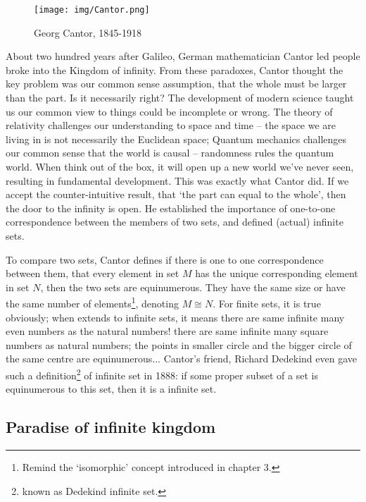 \documentclass{article}
\begin{document}
\begin{wrapfigure}{R}{0.4\textwidth}
 \centering
 \texttt{[image: img/Cantor.png]}
 \captionsetup{labelformat=empty}
 \caption{Georg Cantor, 1845-1918}
 \label{fig:Cantor}
\end{wrapfigure}

About two hundred years after Galileo, German mathematician Cantor led people broke into the Kingdom of infinity. From these paradoxes, Cantor thought the key problem was our common sense assumption, that the whole must be larger than the part. Is it necessarily right? The development of modern science taught us our common view to things could be incomplete or wrong. The theory of relativity challenges our understanding to space and time -- the space we are living in is not necessarily the Euclidean space; Quantum mechanics challenges our common sense that the world is causal -- randomness rules the quantum world. When think out of the box, it will open up a new world we've never seen, resulting in fundamental development. This was exactly what Cantor did. If we accept the counter-intuitive result, that `the part can equal to the whole', then the door to the infinity is open. He established the importance of one-to-one correspondence between the members of two sets, and defined (actual) infinite sets.

To compare two sets, Cantor defines if there is one to one correspondence between them, that every element in set $M$ has the unique corresponding element in set $N$, then the two sets are equinumerous. They have the same size or have the same number of elements\footnote{Remind the `isomorphic' concept introduced in chapter 3.}, denoting $M \cong N$. For finite sets, it is true obviously; when extends to infinite sets, it means there are same infinite many even numbers as the natural numbers! there are same infinite many square numbers as natural numbers; the points in smaller circle and the bigger circle of the same centre are equinumerous... Cantor's friend, Richard Dedekind even gave such a definition\footnote{known as Dedekind infinite set.} of infinite set in 1888: if some proper subset of a set is equinumerous to this set, then it is a infinite set.


\subsection{Paradise of infinite kingdom}
\end{document}
